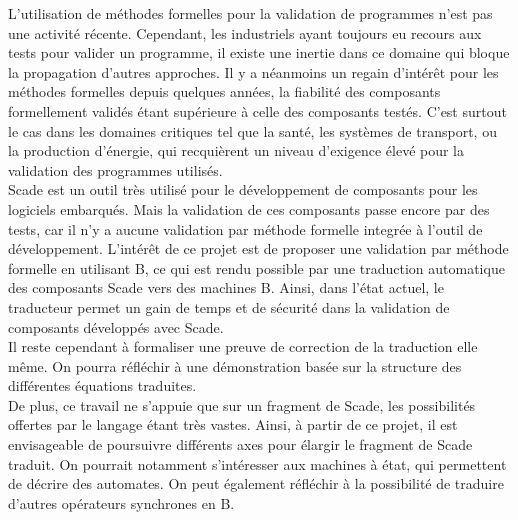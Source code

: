 

L'utilisation de méthodes formelles pour la validation de programmes n'est pas
une activité récente. Cependant, les industriels ayant toujours eu recours aux
tests pour valider un programme, il existe une inertie dans ce domaine
qui bloque la propagation d'autres approches.
Il y a néanmoins un regain d'intérêt pour les méthodes formelles
depuis quelques années, la fiabilité des composants formellement
validés étant supérieure à celle des composants testés. C'est surtout
le cas dans les domaines critiques tel que la santé, les systèmes de
transport, ou la production d'énergie, qui recquièrent un niveau
d'exigence élevé pour la validation des programmes utilisés.\\

Scade est un outil très utilisé pour le développement de composants
pour les logiciels embarqués. Mais la validation de ces composants
passe encore par des tests, car il n'y a aucune validation par méthode
formelle integrée à l'outil de développement. L'intérêt de ce projet
est de proposer une validation par méthode formelle en utilisant B, ce
qui est rendu possible par une traduction automatique des composants Scade
vers des machines B. 
Ainsi, dans l'état actuel, le traducteur permet un gain de temps et de
sécurité dans la validation de composants développés avec Scade.\\

Il reste cependant à formaliser une preuve de correction de la
traduction elle même. On pourra réfléchir à une démonstration basée
sur la structure des différentes équations traduites.\\
De plus, ce travail ne s'appuie que sur un fragment de Scade, les possibilités
offertes par le langage étant très vastes. Ainsi, à partir de ce
projet, il est envisageable de poursuivre différents axes pour élargir
le fragment de Scade traduit. On pourrait notamment s'intéresser aux
machines à état, qui permettent de décrire des automates. On peut
également réfléchir à la possibilité de traduire d'autres opérateurs
synchrones en B. 

